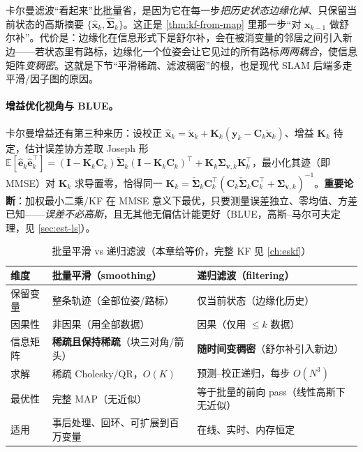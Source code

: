 \begin{insight}[滤波 $=$ 边缘化历史]
卡尔曼滤波“看起来”比批量省，是因为它在每一步\emph{把历史状态边缘化掉}、只保留当前状态的高斯摘要 $\{\hat{\mathbf{x}}_k,\hat{\boldsymbol{\Sigma}}_k\}$。这正是 \cref{thm:kf-from-map} 里那一步“对 $\mathbf{x}_{k-1}$ 做舒尔补”。代价是：边缘化在信息形式下是舒尔补，会在被消变量的邻居之间引入新边——若状态里有路标，边缘化一个位姿会让它见过的所有路标\emph{两两耦合}，使信息矩阵\emph{变稠密}。这就是下节“平滑稀疏、滤波稠密”的根，也是现代 SLAM 后端多走平滑/因子图的原因。
\end{insight}

\paragraph{增益优化视角与 BLUE。}
卡尔曼增益还有第三种来历\cite{barfoot2024state}：设校正 $\hat{\mathbf{x}}_k=\check{\mathbf{x}}_k+\mathbf{K}_k(\mathbf{y}_k-\mathbf{C}_k\check{\mathbf{x}}_k)$、增益 $\mathbf{K}_k$ 待定，估计误差协方差取 Joseph 形 $\mathbb{E}[\hat{\mathbf{e}}_k\hat{\mathbf{e}}_k^\top]=(\mathbf{I}-\mathbf{K}_k\mathbf{C}_k)\check{\boldsymbol{\Sigma}}_k(\mathbf{I}-\mathbf{K}_k\mathbf{C}_k)^\top+\mathbf{K}_k\boldsymbol{\Sigma}_{\mathbf{v},k}\mathbf{K}_k^\top$，最小化其迹（即 MMSE）对 $\mathbf{K}_k$ 求导置零，恰得同一 $\mathbf{K}_k=\check{\boldsymbol{\Sigma}}_k\mathbf{C}_k^\top(\mathbf{C}_k\check{\boldsymbol{\Sigma}}_k\mathbf{C}_k^\top+\boldsymbol{\Sigma}_{\mathbf{v},k})^{-1}$。\textbf{重要论断}：加权最小二乘/KF 在 MMSE 意义下最优，只要测量误差独立、零均值、方差已知——\emph{误差不必高斯}，且无其他无偏估计能更好（BLUE，高斯–马尔可夫定理，见 \cref{sec:est-ls}）。

\begin{table}[H]\centering\small
\caption{批量平滑 vs 递归滤波（本章给等价，完整 KF 见 \cref{ch:eskf}）}
\label{tab:est-batch-vs-recursive}
\begin{tabular}{lll}
\toprule
维度 & 批量平滑（smoothing） & 递归滤波（filtering） \\
\midrule
保留变量 & 整条轨迹（全部位姿/路标） & 仅当前状态（边缘化历史） \\
因果性 & 非因果（用全部数据） & 因果（仅用 $\le k$ 数据） \\
信息矩阵 & \textbf{稀疏且保持稀疏}（块三对角/箭头） & \textbf{随时间变稠密}（舒尔补引入新边） \\
求解 & 稀疏 Cholesky/QR，$O(K)$ & 预测–校正递归，每步 $O(N^3)$ \\
最优性 & 完整 MAP（无近似） & 等于批量的前向 pass（线性高斯下无近似） \\
适用 & 事后处理、回环、可扩展到百万变量 & 在线、实时、内存恒定 \\
\bottomrule
\end{tabular}
\end{table}

